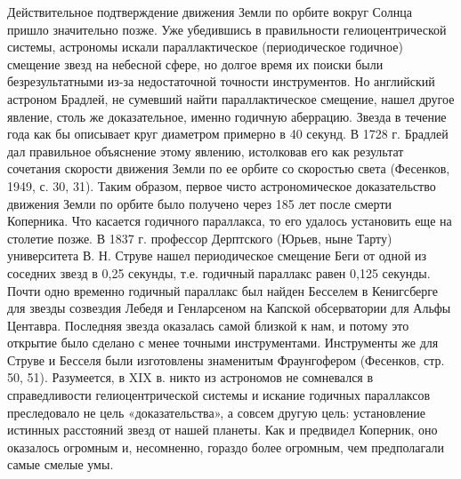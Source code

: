 Действительное   подтверждение  движения   Земли   по  орбите   вокруг
Солнца  пришло  значительно  позже.   Уже  убедившись  в  правильности
гелиоцентрической    системы,   астрономы    искали   параллактическое
(периодическое  годичное)   смещение  звезд  на  небесной   сфере,  но
долгое  время  их  поиски были  безрезультатными  из-за  недостаточной
точности  инструментов. Но  английский астроном  Брадлей, не  сумевший
найти  параллактическое  смещение,  нашел  другое  явление,  столь  же
доказательное,  именно  годичную  аберрацию.  Звезда  в  течение  года
как  бы описывает  круг  диаметром примерно  в 40  секунд.  В 1728  г.
Брадлей  дал  правильное  объяснение  этому  явлению,  истолковав  его
как  результат  сочетания скорости  движения  Земли  по ее  орбите  со
скоростью света  (Фесенков, 1949,  с. 30,  31). Таким  образом, первое
чисто  астрономическое доказательство  движения Земли  по орбите  было
получено через 185 лет после  смерти Коперника. Что касается годичного
параллакса, то его удалось установить еще на столетие позже. В 1837 г.
профессор  Дерптского (Юрьев,  ныне Тарту)  университета В.  Н. Струве
нашел периодическое  смещение Беги от  одной из соседних звезд  в 0,25
секунды,  т.е.  годичный параллакс  равен  0,125  секунды. Почти  одно
временно  годичный параллакс  был  найден Бесселем  в Кенигсберге  для
звезды  созвездия Лебедя  и  Генларсеном на  Капской обсерватории  для
Альфы  Центавра. Последняя  звезда оказалась  самой близкой  к нам,  и
потому  это  открытие  было  сделано с  менее  точными  инструментами.
Инструменты  же  для  Струве  и Бесселя  были  изготовлены  знаменитым
Фраунгофером (Фесенков,  стр. 50, 51).  Разумеется, в XIX в.  никто из
астрономов не сомневался в  справедливости гелиоцентрической системы и
искание  годичных параллаксов  преследовало не  цель «доказательства»,
а  совсем  другую  цель:  установление истинных  расстояний  звезд  от
нашей планеты.  Как и  предвидел Коперник,  оно оказалось  огромным и,
несомненно, гораздо более огромным, чем предполагали самые смелые умы.

